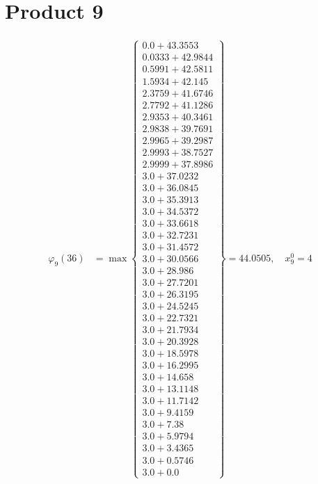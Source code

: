 \documentclass{article}
\begin{document}
\section{Product 9}
\begin{align*}
\varphi_{9}(36) &= \max \left\{ \begin{array}{c}
0.0 + 43.3553 \\
 0.0333 + 42.9844 \\
 0.5991 + 42.5811 \\
 1.5934 + 42.145 \\
 2.3759 + 41.6746 \\
 2.7792 + 41.1286 \\
 2.9353 + 40.3461 \\
 2.9838 + 39.7691 \\
 2.9965 + 39.2987 \\
 2.9993 + 38.7527 \\
 2.9999 + 37.8986 \\
 3.0 + 37.0232 \\
 3.0 + 36.0845 \\
 3.0 + 35.3913 \\
 3.0 + 34.5372 \\
 3.0 + 33.6618 \\
 3.0 + 32.7231 \\
 3.0 + 31.4572 \\
 3.0 + 30.0566 \\
 3.0 + 28.986 \\
 3.0 + 27.7201 \\
 3.0 + 26.3195 \\
 3.0 + 24.5245 \\
 3.0 + 22.7321 \\
 3.0 + 21.7934 \\
 3.0 + 20.3928 \\
 3.0 + 18.5978 \\
 3.0 + 16.2995 \\
 3.0 + 14.658 \\
 3.0 + 13.1148 \\
 3.0 + 11.7142 \\
 3.0 + 9.4159 \\
 3.0 + 7.38 \\
 3.0 + 5.9794 \\
 3.0 + 3.4365 \\
 3.0 + 0.5746 \\
 3.0 + 0.0
\end{array} \right\}=44.0505, \quad x_{9}^0=4\\
 \\ 
\end{align*}
\end{document}
